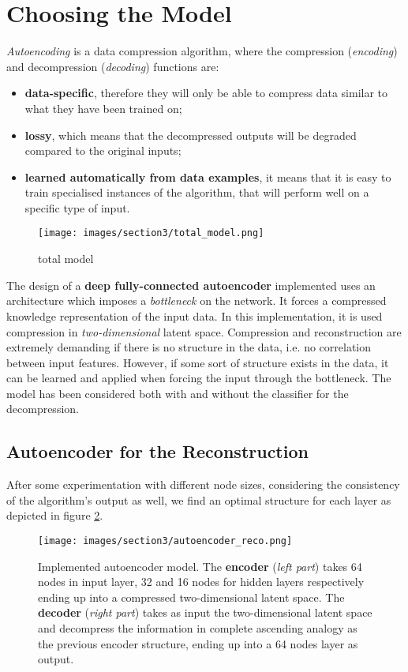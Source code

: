 \documentclass{article}
\begin{document}
\section{Choosing the Model}
\textit{Autoencoding} is a data compression algorithm, where the compression (\textit{encoding}) and decompression (\textit{decoding}) functions are:
\begin{itemize}
  \item \textbf{data-specific}, therefore they will only be able to compress data similar to what they have been trained on;
  \item \textbf{lossy}, which means that the decompressed outputs will be degraded compared to the original inputs;
  \item \textbf{learned automatically from data examples}, it means that it is easy to train specialised instances of the algorithm, 
          that will perform well on a specific type of input.
\end{itemize}


\begin{figure}[H]
  \centering
  \texttt{[image: images/section3/total\_model.png]}
  \caption{total model}
  \label{fig:classifier}
  \end{figure}


\par The design of a \textbf{deep fully-connected autoencoder} implemented uses an architecture which imposes a \textit{bottleneck} on the network. 
It forces a compressed knowledge representation of the input data.
In this implementation, it is used compression in \textit{two-dimensional} latent space. 
Compression and reconstruction are extremely demanding if there is no structure in the data, 
i.e. no correlation between input features. 
However, if some sort of structure exists in the data, it can be learned and applied when forcing the input through the bottleneck.
The model has been considered both with and without the classifier for the decompression.

\subsection{Autoencoder for the Reconstruction}
After some experimentation with different node sizes, considering the consistency of 
the algorithm's output as well, we find an optimal structure for each layer as depicted in figure \ref{fig:ae}. 

\begin{figure}[H]
  \centering
  \texttt{[image: images/section3/autoencoder\_reco.png]}
  \caption{Implemented autoencoder model. The \textbf{encoder} (\textit{left part}) takes 64 nodes in input layer, 32 and 16 nodes for
  hidden layers respectively ending up into a compressed two-dimensional latent space. 
  The \textbf{decoder} (\textit{right part}) takes as input the two-dimensional latent space and decompress the information 
  in complete ascending analogy as the previous encoder structure, ending up into a 64 nodes layer as output.}
  \label{fig:ae}
  \end{figure}
\end{document}
